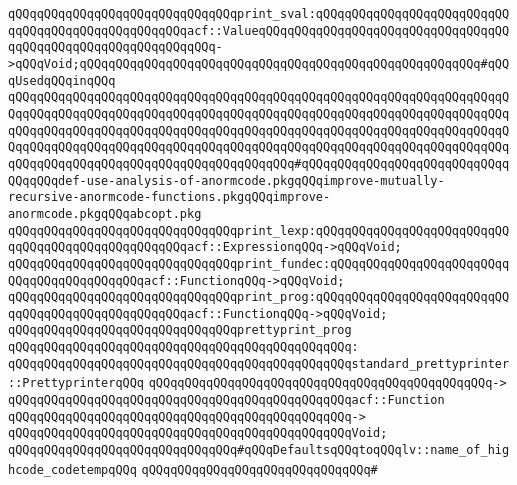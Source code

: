 \verb|qQQqqQQqqQQqqQQqqQQqqQQqqQQqqQQqprint_sval:qQQqqQQqqQQqqQQqqQQqqQQqqQQqqQQqqQQqqQQqqQQqqQQqqQQqacf::ValueqQQqqQQqqQQqqQQqqQQqqQQqqQQqqQQqqQQqqQQqqQQqqQQqqQQqqQQqqQQqqQQq->qQQqVoid;qQQqqQQqqQQqqQQqqQQqqQQqqQQqqQQqqQQqqQQqqQQqqQQqqQQqqQQq#qQQqUsedqQQqinqQQq|\newline
\verb|qQQqqQQqqQQqqQQqqQQqqQQqqQQqqQQqqQQqqQQqqQQqqQQqqQQqqQQqqQQqqQQqqQQqqQQqqQQqqQQqqQQqqQQqqQQqqQQqqQQqqQQqqQQqqQQqqQQqqQQqqQQqqQQqqQQqqQQqqQQqqQQqqQQqqQQqqQQqqQQqqQQqqQQqqQQqqQQqqQQqqQQqqQQqqQQqqQQqqQQqqQQqqQQqqQQqqQQqqQQqqQQqqQQqqQQqqQQqqQQqqQQqqQQqqQQqqQQqqQQqqQQqqQQqqQQqqQQqqQQqqQQqqQQqqQQqqQQqqQQqqQQqqQQqqQQqqQQqqQQq#qQQqqQQqqQQqqQQqqQQqqQQqqQQqqQQqqQQqdef-use-analysis-of-anormcode.pkgqQQqimprove-mutually-recursive-anormcode-functions.pkgqQQqimprove-anormcode.pkgqQQqabcopt.pkg|\newline
\verb|qQQqqQQqqQQqqQQqqQQqqQQqqQQqqQQqprint_lexp:qQQqqQQqqQQqqQQqqQQqqQQqqQQqqQQqqQQqqQQqqQQqqQQqqQQqacf::ExpressionqQQq->qQQqVoid;|\newline
\verb|qQQqqQQqqQQqqQQqqQQqqQQqqQQqqQQqprint_fundec:qQQqqQQqqQQqqQQqqQQqqQQqqQQqqQQqqQQqqQQqqQQqacf::FunctionqQQq->qQQqVoid;|\newline
\verb|qQQqqQQqqQQqqQQqqQQqqQQqqQQqqQQqprint_prog:qQQqqQQqqQQqqQQqqQQqqQQqqQQqqQQqqQQqqQQqqQQqqQQqqQQqacf::FunctionqQQq->qQQqVoid;|\newline
\newline
\verb|qQQqqQQqqQQqqQQqqQQqqQQqqQQqqQQqprettyprint_prog|\newline
\verb|qQQqqQQqqQQqqQQqqQQqqQQqqQQqqQQqqQQqqQQqqQQqqQQq:|\newline
\verb|qQQqqQQqqQQqqQQqqQQqqQQqqQQqqQQqqQQqqQQqqQQqqQQqstandard_prettyprinter::PrettyprinterqQQq|\newline
\verb|qQQqqQQqqQQqqQQqqQQqqQQqqQQqqQQqqQQqqQQqqQQqqQQq->|\newline
\verb|qQQqqQQqqQQqqQQqqQQqqQQqqQQqqQQqqQQqqQQqqQQqqQQqacf::Function|\newline
\verb|qQQqqQQqqQQqqQQqqQQqqQQqqQQqqQQqqQQqqQQqqQQqqQQq->|\newline
\verb|qQQqqQQqqQQqqQQqqQQqqQQqqQQqqQQqqQQqqQQqqQQqqQQqVoid;|\newline
\newline
\verb|qQQqqQQqqQQqqQQqqQQqqQQqqQQqqQQq#qQQqDefaultsqQQqtoqQQqlv::name_of_highcode_codetempqQQq|\newline
\verb|qQQqqQQqqQQqqQQqqQQqqQQqqQQqqQQq#|\newline

